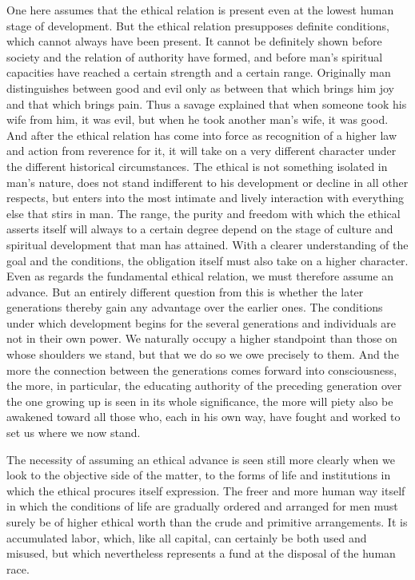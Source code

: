 \documentclass[12pt,a4paper,openany]{book}
\newcommand{\opage}[1]{\marginnote{\footnotesize\textit{[#1]}}}
\begin{document}
One here assumes that the ethical relation is present even at the lowest
human stage of development. But the ethical relation presupposes
definite conditions, which cannot always have been present. It cannot be
definitely shown before society and the relation of authority have
formed, and before man's spiritual capacities have reached a certain
strength and a certain range. Originally man distinguishes between good
and evil only as between that which brings him joy and that which brings
pain. Thus a savage explained that when someone took his wife from him, it
was evil, but when he took another man's wife, it was good. And after the
ethical relation has come into force as recognition of a higher law and
action from reverence for it, it will take on a very different character
under the different historical circumstances. The ethical is not something
isolated in man's nature, does not stand indifferent to his development or
decline in all other respects, but enters into the most intimate and lively
interaction with everything else that stirs in man. The range, the purity
and freedom with which the ethical asserts itself will always to a certain
degree depend on the stage of culture and spiritual development that man
has attained. With a clearer understanding of the goal and the conditions,
the obligation itself must also take on a higher character. Even as
\opage{94}regards the fundamental ethical relation, we must therefore
assume an advance. But an entirely different question from this is whether
the later generations thereby gain any advantage over the earlier ones.
The conditions under which development begins for the several generations
and individuals are not in their own power. We naturally occupy a higher
standpoint than those on whose shoulders we stand, but that we do so we owe
precisely to them. And the more the connection between the generations
comes forward into consciousness, the more, in particular, the educating
authority of the preceding generation over the one growing up is seen in
its whole significance, the more will piety also be awakened toward all
those who, each in his own way, have fought and worked to set us where we
now stand.

The necessity of assuming an ethical advance is seen still more clearly
when we look to the objective side of the matter, to the forms of life
and institutions in which the ethical procures itself expression. The
freer and more human way itself in which the conditions of life are
gradually ordered and arranged for men must surely be of higher ethical
worth than the crude and primitive arrangements. It is accumulated labor,
which, like all capital, can certainly be both used and misused, but which
nevertheless represents a fund at the disposal of the human race.
\end{document}

